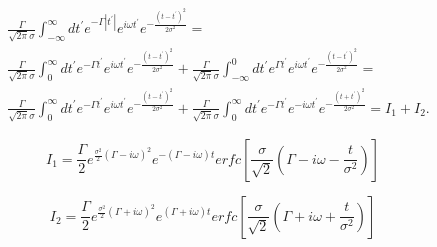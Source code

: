 \documentclass[a4paper,10pt]{article}
\begin{document}




\begin{equation}
\begin{split}
 &\frac{\Gamma}{\sqrt{2\pi}\sigma}\int_{-\infty}^{\infty} dt^{\prime} e^{-\Gamma \left|t^{\prime}\right|}e^{i\omega t^{\prime}}e^{-\frac{\left(t-t^{\prime}\right)^2}{2\sigma^2}} = \\
 &\frac{\Gamma}{\sqrt{2\pi}\sigma}\int_{0}^{\infty} dt^{\prime} e^{-\Gamma t^{\prime}}e^{i\omega t^{\prime}}e^{-\frac{\left(t-t^{\prime}\right)^2}{2\sigma^2}} + \frac{\Gamma}{\sqrt{2\pi}\sigma}\int_{-\infty}^{0} dt^{\prime} e^{\Gamma t^{\prime}}e^{i\omega t^{\prime}}e^{-\frac{\left(t-t^{\prime}\right)^2}{2\sigma^2}} = \\
 &\frac{\Gamma}{\sqrt{2\pi}\sigma}\int_{0}^{\infty} dt^{\prime} e^{-\Gamma t^{\prime}}e^{i\omega t^{\prime}}e^{-\frac{\left(t-t^{\prime}\right)^2}{2\sigma^2}} + \frac{\Gamma}{\sqrt{2\pi}\sigma}\int_{0}^{\infty} dt^{\prime} e^{-\Gamma t^{\prime}}e^{-i\omega t^{\prime}}e^{-\frac{\left(t+t^{\prime}\right)^2}{2\sigma^2}} = I_1 + I_2.
\end{split}
\end{equation}

\begin{equation}
 I_1 = \frac{\Gamma}{2}e^{\frac{\sigma^2}{2}\left(\Gamma-i\omega\right)^2}e^{-\left(\Gamma-i\omega\right)t}erfc\left[\frac{\sigma}{\sqrt{2}}\left(\Gamma-i\omega-\frac{t}{\sigma^2}\right)\right]
\end{equation}

\begin{equation}
 I_2 = \frac{\Gamma}{2}e^{\frac{\sigma^2}{2}\left(\Gamma+i\omega\right)^2}e^{\left(\Gamma+i\omega\right)t}erfc\left[\frac{\sigma}{\sqrt{2}}\left(\Gamma+i\omega+\frac{t}{\sigma^2}\right)\right]
\end{equation}
\end{document}
